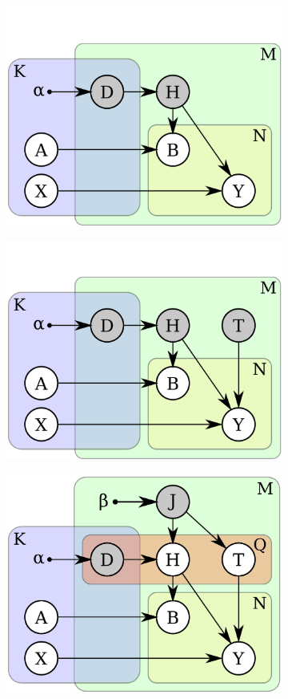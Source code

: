 \begin{figure}[ht]
\centering
\begin{subfigure}[t]{0.48\linewidth}
	\includegraphics[width=0.8\linewidth]{fig/reg/graphicalModelNoPose.pdf}
	\label{fig/reg/graphicalModelNoPose}
\end{subfigure}  
\begin{subfigure}[t]{0.48\linewidth}
	\includegraphics[width=0.8\linewidth]{fig/reg/graphicalModelNoParticle.pdf}
	\label{fig/reg/graphicalModelNoParticle}
\end{subfigure}
\begin{subfigure}[t]{0.48\linewidth}
	\includegraphics[width=0.8\linewidth]{fig/reg/graphicalModelParticle.pdf}

\end{subfigure}
\end{figure}
